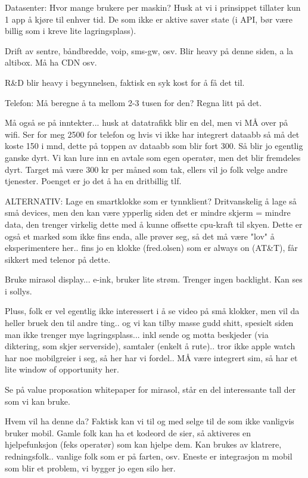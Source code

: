 Datasenter: Hvor mange brukere per maskin? Husk at vi i prinsippet tillater kun
1 app å kjøre til enhver tid. De som ikke er aktive saver state (i API, bør
være billig som i kreve lite lagringsplass).

Drift av sentre, båndbredde, voip, sms-gw, osv. Blir heavy på denne siden, a la
altibox. Må ha CDN osv.

R\&{}D blir heavy i begynnelsen, faktisk en syk kost for å få det til.

Telefon: Må beregne å ta mellom 2-3 tusen for den? Regna litt på det.

Må også se på inntekter... husk at datatrafikk blir en del, men vi MÅ over på
wifi. Ser for meg 2500 for telefon og hvis vi ikke har integrert dataabb så må
det koste 150 i mnd, dette på toppen av dataabb som blir fort 300. Så blir jo
egentlig ganske dyrt. Vi kan lure inn en avtale som egen operatør, men det blir
fremdeles dyrt. Target må være 300 kr per måned som tak, ellers vil jo folk
velge andre tjenester. Poenget er jo det å ha en dritbillig tlf.

ALTERNATIV: Lage en smartklokke som er tynnklient? Dritvanskelig å lage så små
devices, men den kan være ypperlig siden det er mindre skjerm = mindre data,
den trenger virkelig dette med å kunne offsette cpu-kraft til skyen. Dette er
også et marked som ikke fins enda, alle prøver seg, så det må være "lov" å
eksperimentere her.. fins jo en klokke (fred.olsen) som er always on (AT\&{}T),
får sikkert med telenor på dette.

Bruke mirasol display... e-ink, bruker lite strøm. Trenger ingen backlight. Kan
ses i sollys.

Pluss, folk er vel egentlig ikke interessert i å se video på små klokker, men
vil da heller bruek den til andre ting.. og vi kan tilby masse gudd shitt,
spesielt siden man ikke trenger mye lagringsplass... inkl sende og motta
beskjeder (via diktering, som skjer serverside), samtaler (enkelt å rute)..
tror ikke apple watch har noe mobilgreier i seg, så her har vi fordel.. MÅ være
integrert sim, så har et lite window of opportunity her.

Se på value proposation whitepaper for mirasol, står en del interessante tall
der som vi kan bruke.

Hvem vil ha denne da? Faktisk kan vi til og med selge til de som ikke vanligvis
bruker mobil. Gamle folk kan ha et kodeord de sier, så aktiveres en
hjelpefunksjon (feks operatør) som kan hjelpe dem. Kan brukes av klatrere,
redningsfolk.. vanlige folk som er på farten, osv. Eneste er integrasjon m
mobil som blir et problem, vi bygger jo egen silo her.

